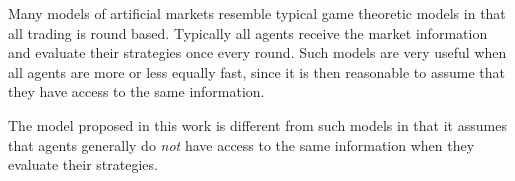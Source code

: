 Many models of artificial markets resemble typical game theoretic models in that all trading is round based. Typically all agents receive the market information and evaluate their strategies once every round. Such models are very useful when all agents are more or less equally fast, since it is then reasonable to assume that they have access to the same information. 

The model proposed in this work is different from such models in that it assumes that agents generally do \textit{not} have access to the same information when they evaluate their strategies. 